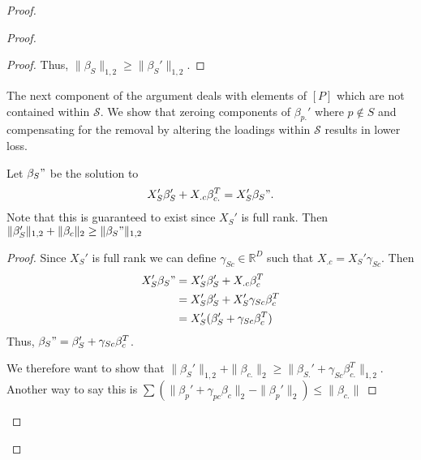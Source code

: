 \begin{proof}
\begin{proof}
\begin{proof}
Thus, $\|\beta_S\|_{1,2} \geq \|\beta_S'\|_{1,2}$.

\end{proof}

The next component of the argument deals with elements of $[P]$ which are not contained within $\mathcal S$.
We show that zeroing components of $\beta_{p.}'$ where $p \not \in S$ and compensating for the removal by altering the loadings within $\mathcal S$ results in lower loss.

\begin{proposition}
Let $\beta_S"$ be the solution to
\begin{align}
X_S' \beta_S ' + X_{.c} \beta_{c.}^T = X_S' \beta_S". %
\end{align}
Note that this is guaranteed to exist since $X_S'$ is full rank.  
Then $\|\beta_{S}'\|_{1,2} + \|\beta_c\|_2 \geq \|\beta_S"\|_{1,2}$
\end{proposition}

\begin{proof}
Since $X_S'$ is full rank we can define $\gamma_{Sc} \in \mathbb R^D$ such that $X_{.c} = X_S' \gamma_{Sc}$.
Then 
\begin{align}
X_S' \beta_S" &= X_S' \beta_S ' + X_{.c} \beta_c^T \\
&= X_S' \beta_S ' + X_S' \gamma_{Sc} \beta_c^T \\
&= X_S'( \beta_S ' + \gamma_{Sc} \beta_c^T )
\end{align}
Thus, $\beta_S" = \beta_S' + \gamma_{Sc}\beta_c^T$.

We therefore want to show that $\|\beta_S'\|_{1,2} + \|\beta_{c.}\|_2 \geq \| \beta_{S.}' + \gamma_{Sc}\beta_{c.}^T\|_{1,2}$.
Another way to say this is $ \sum ( \|\beta_p' + \gamma_{pc} \beta_c \|_2  -  \|\beta_p'\|_2) \leq \|\beta_{c.}\| $



\end{proof}
\end{proof}
\end{proof}
